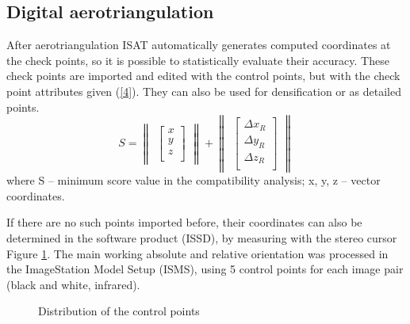 \documentclass[12pt]{spieman}
\begin{document}
\subsection {Digital aerotriangulation}
 After aerotriangulation ISAT automatically generates computed coordinates at the check points, so it is possible to statistically evaluate their accuracy. These check points are imported and edited with the control points, but with the check point attributes given (\ref{4}). They can also be used for densification or as detailed points.  
 \begin{equation}
S =
\begin{Vmatrix}
\begin{bmatrix}
x \\
y \\
z \\
\end{bmatrix} 
\end{Vmatrix}
+
\begin{Vmatrix}
\begin{bmatrix}
\Delta{x_R} \\
\Delta{y_R}  \\
\Delta{z_R} \\
\end{bmatrix} 
\end{Vmatrix}
\label{4}
\end{equation} 
where S – minimum score value in the compatibility analysis; 
x, y, z – vector coordinates. 

If there are no such points imported before, their coordinates can also be determined in the software product (ISSD), by measuring with the stereo cursor Figure \ref{f2}. The main working absolute and relative orientation was processed in the ImageStation Model Setup (ISMS), using 5 control points for each image pair (black and white, infrared). 
\begin{figure}[H] 
\caption{Distribution of the control points}
\label{f2}
\end{figure}
\end{document}

